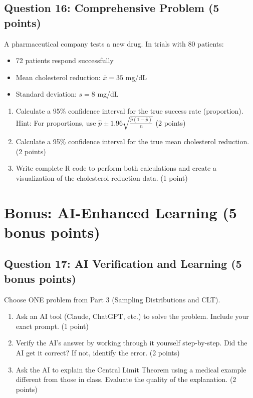 \documentclass[11pt]{article}
\begin{document}
\subsection*{Question 16: Comprehensive Problem (5 points)}

A pharmaceutical company tests a new drug. In trials with 80 patients:
\begin{itemize}
\item 72 patients respond successfully
\item Mean cholesterol reduction: $\bar{x} = 35$ mg/dL
\item Standard deviation: $s = 8$ mg/dL
\end{itemize}

\begin{enumerate}[label=\alph*)]
\item Calculate a 95\% confidence interval for the true success rate (proportion). Hint: For proportions, use $\hat{p} \pm 1.96\sqrt{\frac{\hat{p}(1-\hat{p})}{n}}$ (2 points)
\item Calculate a 95\% confidence interval for the true mean cholesterol reduction. (2 points)
\item Write complete R code to perform both calculations and create a visualization of the cholesterol reduction data. (1 point)
\end{enumerate}

\vspace{1.5cm}

\section*{Bonus: AI-Enhanced Learning (5 bonus points)}

\subsection*{Question 17: AI Verification and Learning (5 bonus points)}

Choose ONE problem from Part 3 (Sampling Distributions and CLT).

\begin{enumerate}[label=\alph*)]
\item Ask an AI tool (Claude, ChatGPT, etc.) to solve the problem. Include your exact prompt. (1 point)
\item Verify the AI's answer by working through it yourself step-by-step. Did the AI get it correct? If not, identify the error. (2 points)
\item Ask the AI to explain the Central Limit Theorem using a medical example different from those in class. Evaluate the quality of the explanation. (2 points)
\end{enumerate}
\end{document}
